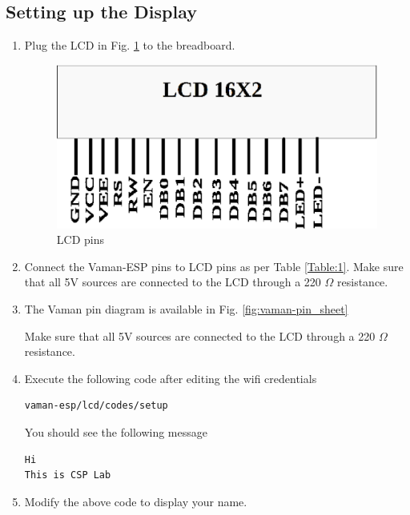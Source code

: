 \subsection{Setting up the Display}
\begin{enumerate}[label=\thesection.\arabic*.,ref=\thesection.\theenumi]

\item
Plug the LCD in Fig. \ref{fig:lcd} to the breadboard.

\begin{figure}
\centering
\includegraphics[width=\columnwidth]{vaman-esp32/lcd/figs/lcd.eps}
\caption{LCD pins}
\label{fig:lcd}
\end{figure}
\item
Connect the Vaman-ESP pins to LCD pins as per Table \ref{Table:1}. Make sure that all 5V sources are connected to the LCD through a 220 $\Omega$ resistance.
\item
The Vaman pin diagram is available in Fig. \ref{fig:vaman-pin_sheet}
\begin{table}[!ht]
\centering

\caption{Make sure that all 5V sources are connected to the LCD through a 220 $\Omega$ resistance.}
\label{Table:1}
\end{table}

\item Execute the following code after editing the wifi credentials
\begin{lstlisting}
vaman-esp/lcd/codes/setup
\end{lstlisting}
You should see the following message
\begin{lstlisting}
Hi
This is CSP Lab
\end{lstlisting}
\item Modify the above code to display your name.
\end{enumerate}
